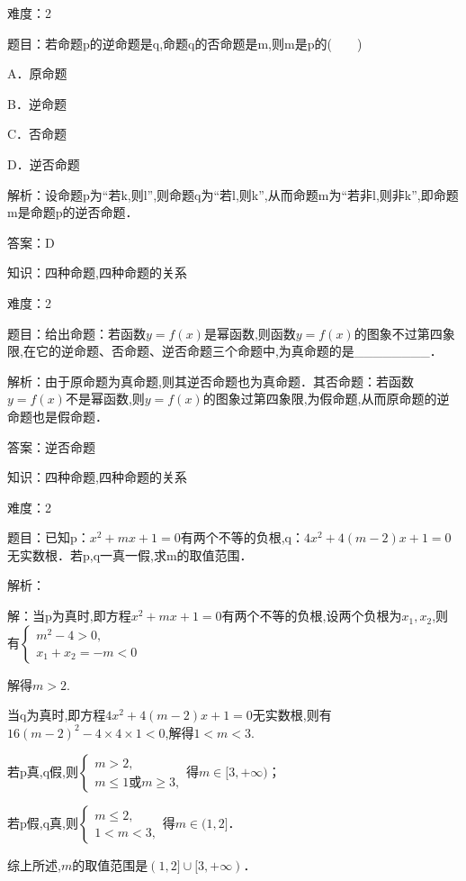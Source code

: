 \documentclass{article} %
\begin{document}
难度：2

题目：若命题p的逆命题是q,命题q的否命题是m,则m是p的(　　)

A．原命题   

B．逆命题

C．否命题   

D．逆否命题

解析：设命题p为``若k,则l'',则命题q为``若l,则k'',从而命题m为``若非l,则非k'',即命题m是命题p的逆否命题．

答案：D



知识：四种命题,四种命题的关系

难度：2

题目：给出命题：若函数$y=f(x)$是幂函数,则函数$y=f(x)$的图象不过第四象限,在它的逆命题、否命题、逆否命题三个命题中,为真命题的是\_\_\_\_\_\_\_\_．

解析：由于原命题为真命题,则其逆否命题也为真命题．其否命题：若函数$y=f(x)$不是幂函数,则$y=f(x)$的图象过第四象限,为假命题,从而原命题的逆命题也是假命题．

答案：逆否命题



知识：四种命题,四种命题的关系

难度：2

题目：已知p：$x^{2}+mx+1=0$有两个不等的负根,q：$4x^{2}+4(m-2)x+1=0$无实数根．若p,q一真一假,求m的取值范围．

解析：

解：当p为真时,即方程$x^{2}+mx+1=0$有两个不等的负根,设两个负根为$x_{1},x_{2}$,则有$\left\{
\begin{array}{l}
m^2-4>0, \\
x_1+x_2=-m<0
\end{array}
\right.$

解得$m{>}2$.

当q为真时,即方程$4x^{2}+4(m-2)x+1=0$无实数根,则有$16(m-2)^{2}-4\times4\times1<0$,解得$1<m<3$.

若p真,q假,则$\left\{
\begin{array}{l}
m>2, \\
m\le 1 或 m\ge 3,
\end{array}
\right.$得$m\in [3,+\infty)$；

若p假,q真,则$\left\{
\begin{array}{l}
m \le 2, \\
1<m<3,
\end{array}
\right.$得$m \in (1,2]$．

综上所述,$m$的取值范围是$(1,2]\cup[3,+\infty)$．
\end{document}

